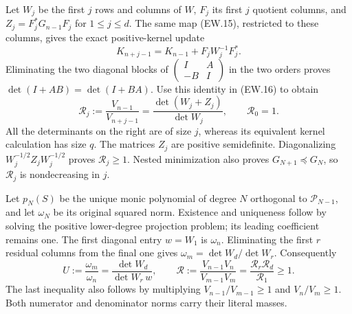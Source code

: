Let $W_j$ be the first $j$ rows and columns of $W$, $F_j$ its
first $j$ quotient columns, and $Z_j=F_j^*G_{n-1}F_j$ for
$1\le j\le d$. The same map (EW.15), restricted to these columns,
gives the exact positive-kernel update
\[
 K_{n+j-1}=K_{n-1}+F_jW_j^{-1}F_j^*.                         \tag{EW.16}
\]
Eliminating the two diagonal blocks of
$\left(\begin{smallmatrix}I&A\\-B&I\end{smallmatrix}\right)$
in the two orders proves $\det(I+AB)=\det(I+BA)$.
Use this identity in (EW.16) to obtain
\[
 \boxed{\mathscr R_j:=\frac{V_{n-1}}{V_{n+j-1}}
     =\frac{\det(W_j+Z_j)}{\det W_j},\qquad \mathscr R_0=1.}
                                                               \tag{EW.17}
\]
All the determinants on the right are of size $j$, whereas its
equivalent kernel calculation has size $q$. The matrices $Z_j$
are positive semidefinite. Diagonalizing
$W_j^{-1/2}Z_jW_j^{-1/2}$ proves $\mathscr R_j\ge1$.
Nested minimization also proves $G_{N+1}\preceq G_N$, so
$\mathscr R_j$ is nondecreasing in $j$.

Let $p_N(S)$ be the unique monic polynomial of degree $N$
orthogonal to $\mathcal P_{N-1}$, and let $\omega_N$ be its
original squared norm. Existence and uniqueness follow by solving the
positive lower-degree projection problem; its leading coefficient
remains one. The first diagonal entry $w=W_1$ is $\omega_n$.
Eliminating the first $r$ residual columns from the final one gives
$\omega_m=\det W_d/\det W_r$. Consequently
\[
 \boxed{U:=\frac{\omega_m}{\omega_n}
    =\frac{\det W_d}{\det W_r\,w},\qquad
 \mathscr R:=\frac{V_{n-1}V_n}{V_{m-1}V_m}
    =\frac{\mathscr R_r\mathscr R_d}{\mathscr R_1}\ge1.}
                                                               \tag{EW.18}
\]
The last inequality also follows by multiplying
$V_{n-1}/V_{m-1}\ge1$ and $V_n/V_m\ge1$. Both numerator
and denominator norms carry their literal masses.

